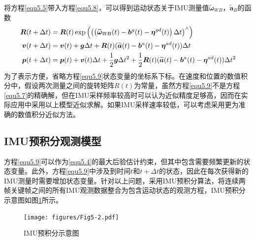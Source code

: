 将方程\eqref{equ5.5}带入方程\eqref{equ5.8}，可以得到运动状态关于IMU测量值$\widetilde{\boldsymbol{\omega}}_{W\!B}$，$\widetilde{\boldsymbol{a}}_B$的函数
\begin{equation}
\label{equ5.9}
\begin{aligned}
\boldsymbol{R}(t+\Delta t) &= \boldsymbol{R}(t)\exp \left( \left(  \left( \widetilde{\boldsymbol{\omega}}_{W\!B}(t)-\boldsymbol{b}^g(t)-\boldsymbol{\eta}^{gd}(t) \right) \Delta t \right)^{\wedge}  \right) \\ 
\boldsymbol{v}(t+\Delta t) &= \boldsymbol{v}(t)+\boldsymbol{g} \Delta t + \boldsymbol{R}(t)(\widetilde{\boldsymbol{a}}(t)-\boldsymbol{b}^a(t)-\boldsymbol{\eta}^{ad}(t))\Delta t \\
\boldsymbol{p}(t+\Delta t) &= \boldsymbol{p}(t)+\boldsymbol{v}(t)\Delta t + {1 \over 2}\boldsymbol{g}\Delta t^2 + {1 \over 2}\boldsymbol{R}(t)(\widetilde{\boldsymbol{a}}(t)-\boldsymbol{b}^a(t)-\boldsymbol{\eta}^{ad}(t))\Delta t^2
\end{aligned}
\end{equation}
为了表示方便，省略方程\eqref{equ5.9}状态变量的坐标系下标。在速度和位置的数值积分中，假设两次测量之间的旋转矩阵$R(t)$为常量，虽然方程\eqref{equ5.9}不是方程\eqref{equ5.7}的精确解，但在IMU采样频率较高时可以认为近似精度足够高，因而在实际应用中采用以上模型近似求解。如果IMU采样速率较低，可以考虑采用更为准确的数值积分近似方法。

\subsection{IMU预积分观测模型}
方程\eqref{equ5.9}可以作为\eqref{equ5.4}的最大后验估计约束，但其中包含需要频繁更新的状态变量。此外，方程\eqref{equ5.9}中涉及到时间$t$和$t+\Delta t$的状态，因此在每次获得新的IMU测量时需要增加状态变量。针对以上问题，采用IMU预积分算法，将连续两帧关键帧之间的所有IMU观测数据整合为包含运动状态的观测方程，IMU预积分示意图如图\ref{fig5.2}所示。

\begin{figure}[h]
\centering
\texttt{[image: figures/Fig5-2.pdf]}
\caption{IMU预积分示意图}
\label{fig5.2}
\end{figure}



